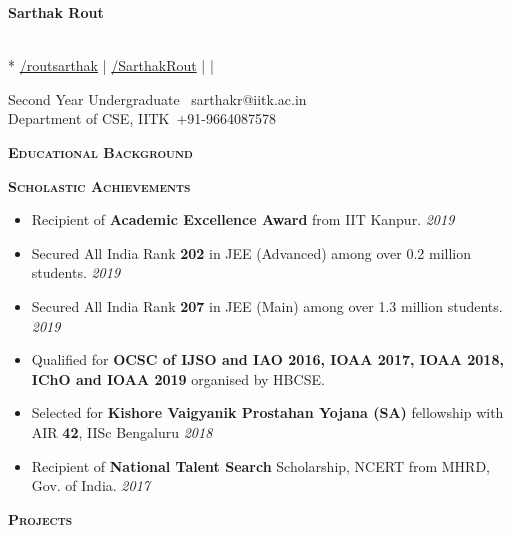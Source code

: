 \documentclass{article}
\begin{document}
\noindent \begin{center}
    \begin{huge}
        \textbf{Sarthak Rout}
    \end{huge}
    \\*
    \vspace{5pt}
     \href{https://www.linkedin.com/in/routsarthak/}{\textbf{\faLinkedin}/routsarthak}  | 
    \href{https://github.com/SarthakRout}{\textbf{\faGithub} /SarthakRout}  |
    \textbf{\href{https://www.facebook.com/sarthak.rout.1}{\faFacebook}} |
    \textbf{\href{https://sarthakrout.github.io}{\faGlobe}}
\end{center} 
\vspace{-3mm}
\noindent
Second Year Undergraduate \hfill \faEnvelope \ sarthakr@iitk.ac.in
\\
Department of CSE, IITK\hfill \faPhone \ +91-9664087578 
\noindent\colorbox{shadecolor}
{\parbox{\dimexpr\textwidth-2\fboxsep\relax}{\textsc{\textbf{Educational Background}}}}
\begin{table}[H]
    \vspace{-4mm}
    \vspace{-4mm}
\end{table}
\noindent\colorbox{shadecolor}
{\parbox{\dimexpr\textwidth-2\fboxsep\relax}{\textsc{\textbf{Scholastic Achievements}}}}
\begin{itemize}[topsep=8pt,itemsep=2pt, partopsep =2pt, parsep =2pt]
    \item Recipient of \textbf{Academic Excellence Award} from IIT Kanpur. \hfill \textit{2019}
    \item Secured All India Rank \textbf{202} in JEE (Advanced) among over 0.2 million students. \hfill \textit{2019}
    \item Secured 
    All India Rank \textbf{207} in JEE (Main) among over 1.3 million students. \hfill \textit{2019}
    \item Qualified for \textbf{OCSC of IJSO and IAO 2016, IOAA 2017, IOAA 2018, IChO and IOAA 2019} organised by HBCSE.
    \item Selected for \textbf{Kishore Vaigyanik Prostahan Yojana (SA)} fellowship with AIR \textbf{42}, IISc Bengaluru \hfill \textit{2018}
    \item Recipient of \textbf{National Talent Search} Scholarship, NCERT from MHRD, Gov. of India. \hfill \textit{2017}
\end{itemize}
\noindent\colorbox{shadecolor}
{\parbox{\dimexpr\textwidth-2\fboxsep\relax}{\textsc{\textbf{Projects}}}}
\end{document}
